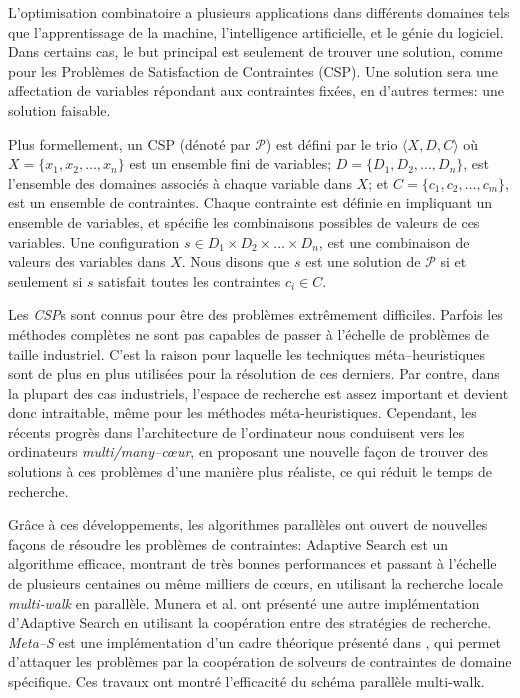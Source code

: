 
L'optimisation combinatoire a plusieurs applications dans diff\'erents domaines tels que l'apprentissage de la machine, l'intelligence artificielle, et le g\'enie du logiciel. Dans certains cas, le but principal est seulement de trouver une solution, comme pour les Probl\`emes de Satisfaction de Contraintes (CSP). Une solution sera une affectation de variables r\'epondant aux contraintes fix\'ees, en d'autres termes: une solution faisable.

Plus formellement, un CSP (d\'enot\'e par $\mathcal{P}$) est d\'efini par le trio $\langle X,D,C \rangle$  o\`u $X = \{x_1, x_2,\dots,x_n\}$ est un ensemble fini de variables; $D = \{D_1, D_2,\dots, D_n\}$, est l'ensemble des domaines associ\'es \`a chaque variable dans $X$; et $C = \{c_1, c_2,\dots,c_m\}$, est un ensemble de contraintes. Chaque contrainte est d\'efinie en impliquant un ensemble de variables, et sp\'ecifie les combinaisons possibles de valeurs de ces variables. Une configuration $s\in D_1\times D_2\times\dots\times D_n$, est une combinaison de valeurs des variables dans $X$. Nous disons que $s$ est une solution de $\mathcal{P}$ si et seulement si $s$ satisfait toutes les contraintes $c_i \in C$.

Les {\it CSP}s sont connus pour \^etre des probl\`emes extr\^emement difficiles. Parfois les m\'ethodes compl\`etes ne sont pas capables de passer \`a l'\'echelle de probl\`emes de taille industriel. C'est la raison  pour laquelle les techniques m\'eta--heuristiques sont de plus en plus utilis\'ees pour la r\'esolution de ces derniers. Par contre, dans la plupart des cas industriels, l'espace de recherche est assez important et devient donc intraitable, m\^eme pour les m\'ethodes m\'eta-heuristiques. Cependant, les r\'ecents progr\`es dans l'architecture de l'ordinateur nous conduisent vers les ordinateurs {\it multi/many--c\oe ur}, en proposant une nouvelle fa\c{c}on de trouver des solutions \`a ces probl\`emes d'une mani\`ere plus r\'ealiste, ce qui r\'eduit le temps de recherche.

Gr\^ace \`a ces d\'eveloppements, les algorithmes parall\`eles ont ouvert de nouvelles fa\c{c}ons de r\'esoudre les probl\`emes de contraintes: Adaptive Search \cite{Diaz} est un algorithme efficace, montrant de tr\`es bonnes performances et passant \`a l'\'echelle de plusieurs centaines ou m\^eme milliers de c\oe urs, en utilisant la recherche locale {\it multi-walk} en parall\`ele. Munera et al. \cite{Munera} ont pr\'esent\'e une autre impl\'ementation d'Adaptive Search en utilisant la coop\'eration entre des strat\'egies de recherche. {\it Meta--S} est une impl\'ementation d'un cadre th\'eorique pr\'esent\'e dans \cite{Frank2003}, qui permet d'attaquer les probl\`emes par la coop\'eration de solveurs de contraintes de domaine sp\'ecifique. 
Ces travaux ont montr\'e l'efficacit\'e du sch\'ema parall\`ele multi-walk.  

